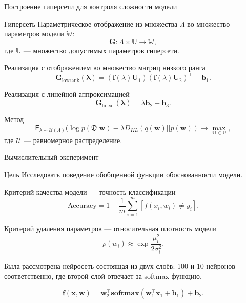 \documentclass[9pt,pdf,hyperref={unicode}]{beamer}
\begin{document}
\begin{frame}[shrink=5]{Построение гиперсети для контроля сложности модели}
\begin{block}{Гиперсеть}
    Параметрическое отображение из множества $\Lambda$ во множество параметров модели $\mathbb{W}$:
    \[ \mathbf{G}: \Lambda \times \mathbb{U} \to \mathbb{W},\]
    где $\mathbb{U}$ --- множество допустимых параметров гиперсети. 
\end{block}
\begin{block}{Реализация с отображением во множество матриц низкого ранга}
    \begin{equation*}
        \mathbf{G}_\text{lowrank}(\mathbf{\lambda})= 
        (\mathbf{f}(\lambda)\mathbf{U}_1) (\mathbf{f} (\lambda) \mathbf{U}_2)^\top + \mathbf{b}_1.
    \end{equation*}
\end{block}
\begin{block}{Реализация с линейной аппроксимацией}
    \begin{equation*}
    \label{hyper2}
    \mathbf{G}_\text{linear}(\mathbf{\lambda})= \lambda\mathbf{b}_2 + \mathbf{b}_3.
    \end{equation*}
\end{block}
\begin{block}{Метод}
    \[\mathsf{E}_{\lambda \sim \mathcal{U}(\Lambda)} (\log p(\mathfrak{D}| \mathbf{w}) - \lambda D_{KL}(q(\mathbf{w})||p(\mathbf{w})) 
\to \max_{\mathbf{U} \in \mathbb{U}},\]
где $\mathcal{U}$ --- равномерное распределение.
\end{block}


\end{frame}
\begin{frame}{Вычислительный эксперимент}
\begin{block}{Цель}
		Исследовать поведение обобщенной функции обоснованности модели.
\end{block}
\begin{block}{Критерий качества модели --- точность классификации}
    \[ \text{Accuracy} = 1 - \frac{1}{m} \sum_{i = 1}^{m}[f(x_i, w_i) \neq y_i].\]
\end{block}
\begin{block}{Критерий удаления параметров --- относительная плотность модели}
\[ \rho(w_i) \approx \exp{\frac{\mu_i^{2}}{2 \sigma_i^{2}}}. \]
\end{block}

Была рассмотрена нейросеть состоящая из двух слоёв: 100 и 10 нейронов соответственно,
где второй слой отвечает за softmax-функцию.

$$\mathbf{f}(\mathbf{x}, \mathbf{w})= \mathbf{w}_2^{\top} \textbf{softmax}(\mathbf{w}_1^{\top} \mathbf{x}_1  + \mathbf{b}_1) + \mathbf{b}_2.$$

\end{frame}
\end{document}
